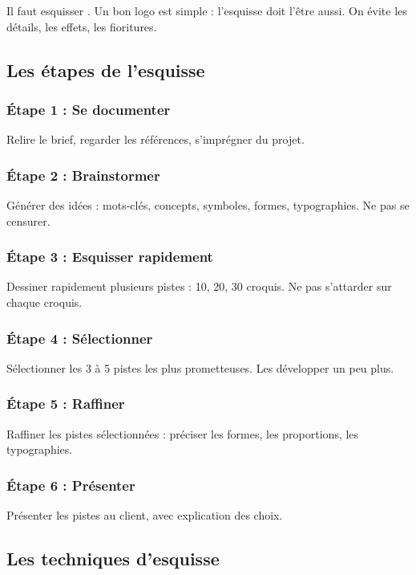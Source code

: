 Il faut esquisser . Un bon logo est simple : l'esquisse doit l'être aussi. On évite les détails, les effets, les fioritures.

\subsection{Les étapes de l'esquisse}

\subsubsection{Étape 1 : Se documenter}

Relire le brief, regarder les références, s'imprégner du projet.

\subsubsection{Étape 2 : Brainstormer}

Générer des idées : mots-clés, concepts, symboles, formes, typographies. Ne pas se censurer.

\subsubsection{Étape 3 : Esquisser rapidement}

Dessiner rapidement plusieurs pistes : 10, 20, 30 croquis. Ne pas s'attarder sur chaque croquis.

\subsubsection{Étape 4 : Sélectionner}

Sélectionner les 3 à 5 pistes les plus prometteuses. Les développer un peu plus.

\subsubsection{Étape 5 : Raffiner}

Raffiner les pistes sélectionnées : préciser les formes, les proportions, les typographies.

\subsubsection{Étape 6 : Présenter}

Présenter les pistes au client, avec explication des choix.

\subsection{Les techniques d'esquisse}

